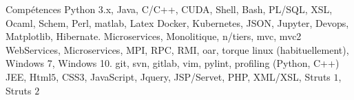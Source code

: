 
\begin{rubric}{Compétences}
%
	Python $3$.x, Java,  C/C++, CUDA, Shell, Bash, PL/SQL, XSL, Ocaml, Schem, Perl, matlab, Latex 
%
	Docker, Kubernetes, JSON, Jupyter, Devops, Matplotlib,  Hibernate.
%
	Microservices, Monolitique, n/tiers, mvc, mvc2
%
	WebServices, Microservices, MPI, RPC, RMI, oar, torque
\entry*[OS]%
    linux (habituellement), Windows 7, Windows 10. 
\entry*[Outils]%
    git, svn, gitlab, vim, pylint, profiling (Python, C++) 
%
  	JEE, Html$5$, CSS$3$, JavaScript, Jquery, JSP/Servet, PHP, XML/XSL, Struts $1$, Struts $2$
\end{rubric}
